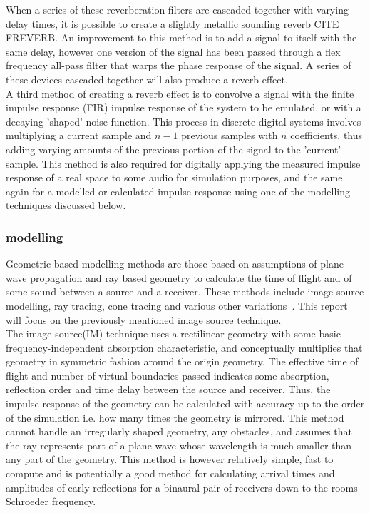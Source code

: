\documentclass[paper=a4, fontsize=10pt, font=arial]{scrartcl} %
\numberwithin{equation}{section} %
\numberwithin{figure}{section} %
\numberwithin{table}{section} %
\begin{document}
When a series of these reverberation filters are cascaded together with varying delay times, it is possible to create a slightly metallic sounding reverb CITE FREVERB. An improvement to this method is to add a signal to itself with the same delay, however one version of the signal has been passed through a flex frequency all-pass filter that warps the phase response of the signal. A series of these devices cascaded together will also produce a reverb effect.\\

A third method of creating a reverb effect is to convolve a signal with the finite impulse response (FIR) impulse response of the system to be emulated, or with a decaying 'shaped' noise function. This process in discrete digital systems involves multiplying a current sample and $n-1$ previous samples with $n$ coefficients, thus adding varying amounts of the previous portion of the signal to the 'current' sample. This method is also required for digitally applying the measured impulse response of a real space to some audio for simulation purposes, and the same again for a modelled or calculated impulse response using one of the modelling techniques discussed below. 

\subsubsection{modelling}
Geometric based modelling methods are those based on assumptions of plane wave propagation and ray based geometry to calculate the time of flight and  of some sound between a source and a receiver. These methods include image source modelling, ray tracing, cone tracing and various other variations~\cite{Elorza2005}. This report will focus on the previously mentioned image source technique.\\

The image source(IM) technique uses a rectilinear geometry with some basic frequency-independent absorption characteristic, and conceptually multiplies that geometry in symmetric fashion around the origin geometry. The effective time of flight and number of virtual boundaries passed indicates some absorption, reflection order and time delay between the source and receiver. Thus, the impulse response of the geometry can be calculated with accuracy up to the order of the simulation i.e. how many times the geometry is mirrored. This method cannot handle an irregularly shaped geometry, any obstacles, and assumes that the ray represents part of a plane wave whose wavelength is much smaller than any part of the geometry. This method is however relatively simple, fast to compute and is potentially a good method for calculating arrival times and amplitudes of early reflections for a binaural pair of receivers down to the rooms Schroeder frequency.
\end{document}
